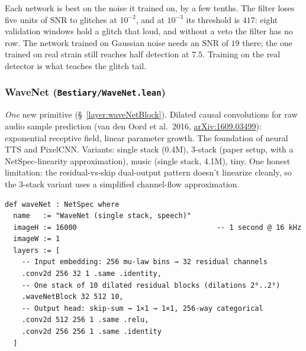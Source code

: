 \noindent Each network is best on the noise it trained on, by a few tenths.
The filter loses five units of SNR to glitches at $10^{-2}$, and at
$10^{-3}$ its threshold is $417$: eight validation windows hold a glitch
that loud, and without a veto the filter has no row. The network trained on
Gaussian noise needs an SNR of $19$ there; the one trained on real strain
still reaches half detection at $7.5$. Training on the real detector is what
teaches the glitch tail. %

\subsubsection*{WaveNet (\texttt{Bestiary/WaveNet.lean})}
\emph{One} new primitive (\S~\ref{layer:waveNetBlock}). Dilated causal
convolutions for raw audio sample prediction (van den Oord et al.\
2016, \href{https://arxiv.org/abs/1609.03499}{arXiv:1609.03499}): exponential receptive field, linear parameter
growth. The foundation of neural TTS and PixelCNN. Variants: single
stack (0.4M), 3-stack (paper setup, with a NetSpec-linearity
approximation), music (single stack, 4.1M), tiny. One honest
limitation: the residual-vs-skip dual-output pattern doesn't
linearize cleanly, so the 3-stack variant uses a simplified
channel-flow approximation.

\begin{verbatim}
def waveNet : NetSpec where
  name   := "WaveNet (single stack, speech)"
  imageH := 16000                                 -- 1 second @ 16 kHz
  imageW := 1
  layers := [
    -- Input embedding: 256 mu-law bins → 32 residual channels
    .conv2d 256 32 1 .same .identity,
    -- One stack of 10 dilated residual blocks (dilations 2⁰..2⁹)
    .waveNetBlock 32 512 10,
    -- Output head: skip-sum → 1×1 → 1×1, 256-way categorical
    .conv2d 512 256 1 .same .relu,
    .conv2d 256 256 1 .same .identity
  ]
\end{verbatim}

